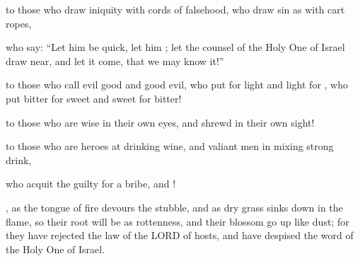 \documentclass[11pt]{article}
\begin{document}
\begin{biblicaloutline}[Isaiah 5:18-25 (B')]
    

    \begin{versesection}{2em}
          to those who draw iniquity with cords of falsehood,
        \poetryline who draw sin as with cart ropes,
        
         who say: ``Let him be quick,
        \poetryline let him 
        \poetryline {};
        let the counsel of the Holy One of Israel draw near,
        \poetryline and let it come, that we may know it!''
    \end{versesection}
    
    
    \begin{versesection}{2em}
          to those who call evil good
        \poetryline and good evil,
        who put  for light
        \poetryline and light for ,
        who put bitter for sweet
        \poetryline and sweet for bitter!
    \end{versesection}
    
    
    \begin{versesection}{2em}
          to those who are wise in their own eyes,
        \poetryline and shrewd in their own sight!
    \end{versesection}
    
    
    \begin{versesection}{2em}
          to those who are heroes at drinking wine,
        \poetryline and valiant men in mixing strong drink,
        
         who acquit the guilty for a bribe,
        \poetryline and !
    \end{versesection}
    
    
    \begin{versesection}{2em}
         , as the tongue of fire devours the stubble,
        \poetryline and as dry grass sinks down in the flame,
        so their root will be as rottenness,
        \poetryline and their blossom go up like dust;
        for they have rejected the law of the LORD of hosts,
        \poetryline and have despised the word of the Holy One of Israel.
        

\end{versesection}
\end{biblicaloutline}
\end{document}
